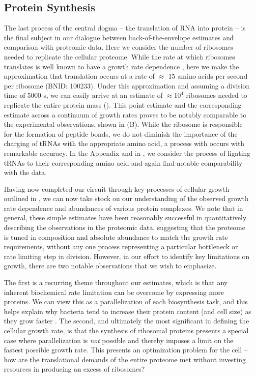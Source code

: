 \subsection{Protein Synthesis}
The last process of the central dogma -- the translation of RNA into protein
-- is the final subject in our dialogue between back-of-the-envelope
estimates and comparison with proteomic data. Here we consider the number of
ribosomes needed to replicate the cellular proteome. While the rate at which
ribosomes translates is well known to have a growth rate dependence
\citep{dai2018}, here we make the approximation that translation occurs at a
rate of $\approx$ 15 amino acids per second per ribosome (BNID: 100233).
Under this approximation and assuming a division time of 5000 s, we can
easily arrive at an estimate of $\approx 10^4$ ribosomes needed to replicate
the entire protein mass (). This point estimate and
the corresponding estimate across a continuum of growth rates proves to be
notably comparable to the experimental observations, shown in
(B). While the ribosome is responsible for the
formation of peptide bonds, we do not diminish the importance of the charging
of tRNAs with the appropriate amino acid, a process with occurs with
remarkable accuracy. In the Appendix and in
, we consider the process of ligating tRNAs
to their corresponding amino acid and again find notable comparability with
the data.

Having now completed our circuit through key processes of cellular growth
outlined in , we can now take stock on our understanding of the
observed growth rate dependence and abundances of various protein complexes. We
note that in general, these simple estimates have been reasonably successful in
quantitatively describing the observations in the proteomic data, suggesting
that the proteome is tuned in composition and absolute abundance to match the
growth rate requirements, without any one process representing a particular
bottleneck or rate limiting step in division. However, in our effort to identify
key limitations on growth, there are two notable observations that we wish to
emphasize.

The first is a recurring theme throughout our estimates, which is that any
inherent biochemical rate limitation can be overcome by expressing more
proteins. We can view this as a parallelization of each biosynthesis task,
and this helps explain why bacteria tend to increase their protein content (and
cell size) as they grow faster \citep{ojkic2019}. The second, and ultimately
the most significant in defining the cellular growth rate, is that the
synthesis of ribosomal proteins presents a special case where parallelization
is \textit{not} possible and thereby imposes a limit on the fastest possible
growth rate. This presents an optimization problem for
the cell -- how are the translational demands of the entire proteome met without
investing resources in producing an excess of ribosomes?



